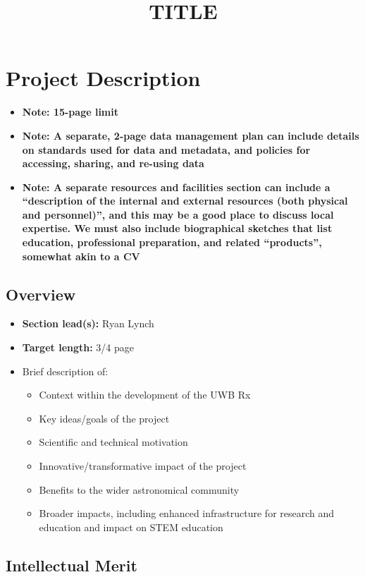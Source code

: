 \documentclass[10pt]{NSF}
\title{TITLE}
\begin{document}
\section{Project Description}
\label{sec:project_description}

\begin{itemize}
\item{\textbf{Note: 15-page limit}}
\item{\textbf{Note: A separate, 2-page data management plan can
      include details on standards used for data and metadata, and
      policies for accessing, sharing, and re-using data}}
\item{\textbf{Note: A separate resources and facilities section can
      include a ``description of the internal and external resources
      (both physical and personnel)'', and this may be a good place to
      discuss local expertise.  We must also include biographical
      sketches that list education, professional preparation, and
      related ``products'', somewhat akin to a CV}}
\end{itemize}

\subsection{Overview}
\label{sec:overview}

\begin{itemize}
\item{\textbf{Section lead(s):} Ryan Lynch}
\item{\textbf{Target length:} 3/4 page}
\item{Brief description of:
    \begin{itemize}
    \item{Context within the development of the UWB Rx}
    \item{Key ideas/goals of the project}
    \item{Scientific and technical motivation}
    \item{Innovative/transformative impact of the project}
    \item{Benefits to the wider astronomical community}
    \item{Broader impacts, including enhanced infrastructure for
        research and education and impact on STEM education}
    \end{itemize}}
\end{itemize}
  
\subsection{Intellectual Merit}
\label{sec:IM}
\end{document}
